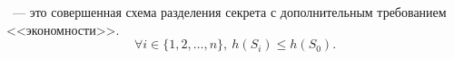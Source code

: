 

\begin{definition*}
    ~--- это совершенная схема разделения секрета с
    дополнительным требованием <<экономности>>.
    $$
        \forall i \in \{1, 2, \dots, n\},\ h(S_i) \le h(S_0).
    $$
\end{definition*}






